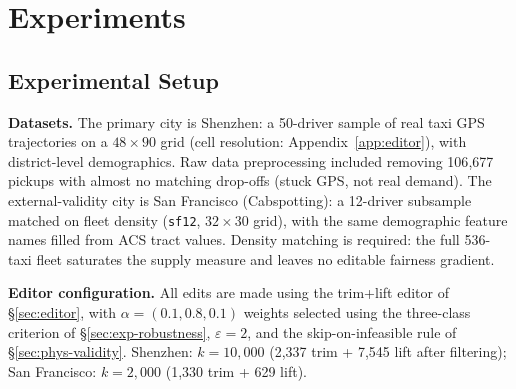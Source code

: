 \section{Experiments}\label{sec:experiments}

\subsection{Experimental Setup}\label{sec:exp-setup}
\textbf{Datasets.} The primary city is Shenzhen: a 50-driver sample of real
taxi GPS trajectories on a $48{\times}90$ grid (cell resolution:
Appendix~\ref{app:editor}), with district-level demographics. Raw data
preprocessing included removing 106{,}677
pickups with almost no matching drop-offs (stuck GPS, not real demand).
The external-validity city is San Francisco (Cabspotting): a 12-driver
subsample matched on fleet density (\texttt{sf12}, $32{\times}30$ grid), with
the same demographic feature names filled from ACS tract values. Density matching is
required: the full 536-taxi fleet saturates the supply measure and leaves
no editable fairness gradient.


\textbf{Editor configuration.} All edits are made using the trim+lift editor of
\S\ref{sec:editor}, with $\alpha = (0.1, 0.8, 0.1)$ weights selected using the 
three-class criterion of \S\ref{sec:exp-robustness}, $\varepsilon = 2$, and the 
skip-on-infeasible rule of \S\ref{sec:phys-validity}. Shenzhen: 
$k = 10{,}000$ (2{,}337 trim + 7{,}545 lift after filtering); San Francisco: 
$k = 2{,}000$ (1{,}330 trim + 629 lift).

